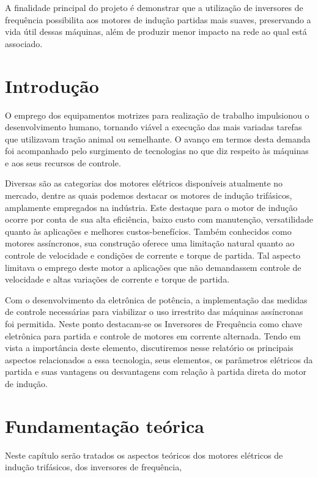 \documentclass[a4paper, 12pt,oneside, english, brazil]{abntex2}
\begin{document}
A finalidade principal do projeto é demonstrar que a utilização de inversores de frequência possibilita aos motores de indução partidas mais suaves, preservando a vida útil dessas máquinas, além de produzir menor impacto na rede ao qual está associado. 


\chapter{Introdução}
O emprego dos equipamentos motrizes para realização de trabalho impulsionou o desenvolvimento humano, tornando viável a execução das mais variadas tarefas que utilizavam tração animal ou semelhante. O avanço em termos desta demanda foi acompanhado pelo surgimento de tecnologias no que diz respeito às máquinas e aos seus recursos de controle.  

Diversas são as categorias dos motores elétricos disponíveis atualmente no mercado, dentre as quais podemos destacar os motores de indução trifásicos, amplamente empregados na indústria. Este destaque para o motor de indução ocorre por conta de sua alta eficiência, baixo custo com manutenção, versatilidade quanto às aplicações e melhores custos-benefícios. Também conhecidos como motores assíncronos, sua construção oferece uma limitação natural quanto ao controle de velocidade e condições de corrente e torque de partida. Tal aspecto limitava o emprego deste motor a aplicações que não demandassem controle de velocidade e altas variações de corrente e torque de partida.

Com o desenvolvimento da eletrônica de potência, a implementação das medidas de controle necessárias para viabilizar o uso irrestrito das máquinas assíncronas foi permitida. Neste ponto destacam-se os Inversores de Frequência como chave eletrônica para partida e controle de motores em corrente alternada. Tendo em vista a importância deste elemento, discutiremos nesse relatório os principais aspectos relacionados a essa tecnologia, seus elementos, os parâmetros elétricos da partida e suas vantagens ou desvantagens com relação à partida direta do motor de indução.  

\chapter{Fundamentação teórica}
Neste capítulo serão tratados os aspectos teóricos dos motores elétricos de indução trifásicos, dos inversores de frequência,
\end{document}
